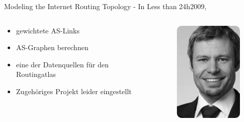 \documentclass[ngerman,compress,hyperref={bookmarks}]{beamer}
\begin{document}
\begin{frame}{Modeling the Internet Routing Topology - In Less than 24h}{2009, \cite{Winter:2009:MIR:1577959.1577976}}
  \begin{columns}[c]
    \begin{column}{0.5\textwidth}
      \begin{itemize}
        \item gewichtete AS-Links
        \item AS-Graphen berechnen
        \item eine der Datenquellen für den Routingatlas
        \item Zugehöriges Projekt leider eingestellt
      \end{itemize}
    \end{column}
    \begin{column}{0.09\textwidth}
      \begin{figure}
        \label{winter}
        \includegraphics[width=1\textwidth]{images/winter_r}

\end{figure}
\end{column}
\end{columns}
\end{frame}
\end{document}
